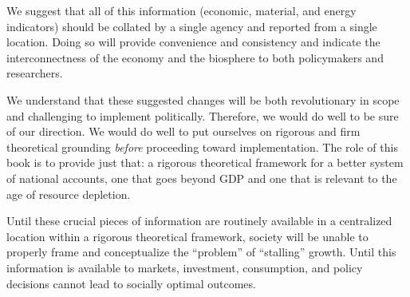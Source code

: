 We suggest that all of this information 
(economic, material, and energy indicators) 
should be collated by a single agency and
reported from a single location.
Doing so will provide convenience and consistency and
indicate the interconnectness of the economy and the biosphere
to both policymakers and researchers.

We understand that these suggested changes will be both 
revolutionary in scope and
challenging to implement politically.
Therefore, we would do well to be sure of our direction.
We would do well to put ourselves on rigorous and firm theoretical grounding
\emph{before} proceeding toward implementation. 
The role of this book is to provide just that:
a rigorous theoretical framework
for a better system of national accounts,
one that goes beyond GDP and
one that is relevant to the age of resource depletion.

Until these crucial pieces of information are routinely available 
in a centralized location within a rigorous theoretical framework, 
society will be unable to properly frame and conceptualize 
the ``problem'' of ``stalling'' growth. 
Until this information is available to markets,
investment, consumption, and policy decisions cannot
lead to socially optimal outcomes.









%
%

